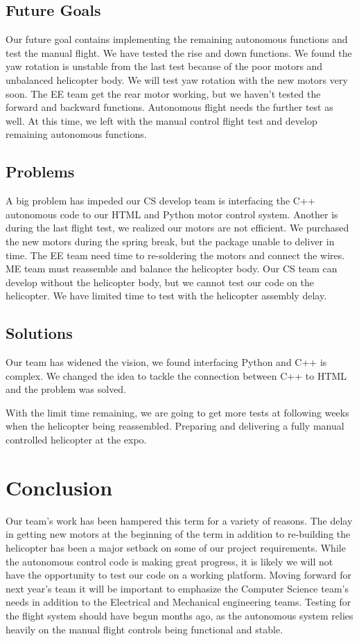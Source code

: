 \documentclass[onecolumn, draftclsnofoot,10pt, compsoc]{IEEEtran}
\begin{document}
\subsection{Future Goals}

Our future goal contains implementing the remaining autonomous functions and test the manual flight. We have tested the rise and down functions. We found the yaw rotation is unstable from the last test because of the poor motors and unbalanced helicopter body. We will test yaw rotation with the new motors very soon. The EE team get the rear motor working, but we haven’t tested the forward and backward functions. Autonomous flight needs the further test as well. At this time, we left with the manual control flight test and develop remaining autonomous functions.

\subsection{Problems}

A big problem has impeded our CS develop team is interfacing the C++ autonomous code to our HTML and Python motor control system. Another is during the last flight test, we realized our motors are not efficient. We purchased the new motors during the spring break, but the package unable to deliver in time. The EE team need time to re-soldering the motors and connect the wires. ME team must reassemble and balance the helicopter body. Our CS team can develop without the helicopter body, but we cannot test our code on the helicopter. We have limited time to test with the helicopter assembly delay.

\subsection{Solutions}

Our team has widened the vision, we found interfacing Python and C++ is complex. We changed the idea to tackle the connection between C++ to HTML and the problem was solved.

With the limit time remaining, we are going to get more tests at following weeks when the helicopter being reassembled. Preparing and delivering a fully manual controlled helicopter at the expo.

\section{Conclusion}

Our team's work has been hampered this term for a variety of reasons. The delay in getting new motors at the beginning of the term in addition to re-building the helicopter has been a major setback on some of our project requirements. While the autonomous control code is making great progress, it is likely we will not have the opportunity to test our code on a working platform. Moving forward for next year's team it will be important to emphasize the Computer Science team's needs in addition to the Electrical and Mechanical engineering teams. Testing for the flight system should have begun months ago, as the autonomous system relies heavily on the manual flight controls being functional and stable. 





\end{document}
